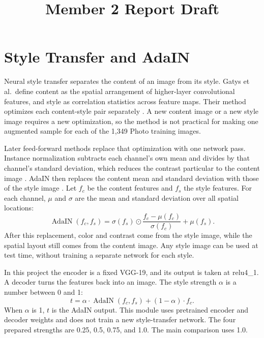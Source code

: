 \documentclass[a4paper]{article}
\title{Member 2 Report Draft}
\author{}
\date{}
\begin{document}
\maketitle

\section{Style Transfer and AdaIN}

Neural style transfer separates the content of an image from its style. Gatys et al.\ define content as the spatial arrangement of higher-layer convolutional features, and style as correlation statistics across feature maps. Their method optimizes each content-style pair separately \cite{gatys2016image}. A new content image or a new style image requires a new optimization, so the method is not practical for making one augmented sample for each of the 1,349 Photo training images.

Later feed-forward methods replace that optimization with one network pass. Instance normalization subtracts each channel's own mean and divides by that channel's standard deviation, which reduces the contrast particular to the content image \cite{ulyanov2016instance,ulyanov2017improved}. AdaIN then replaces the content mean and standard deviation with those of the style image \cite{huang2017adain}. Let $f_c$ be the content features and $f_s$ the style features. For each channel, $\mu$ and $\sigma$ are the mean and standard deviation over all spatial locations:
\begin{equation}
\operatorname{AdaIN}(f_c,f_s)
=
\sigma(f_s)\odot\frac{f_c-\mu(f_c)}{\sigma(f_c)}+\mu(f_s).
\end{equation}
After this replacement, color and contrast come from the style image, while the spatial layout still comes from the content image. Any style image can be used at test time, without training a separate network for each style.

In this project the encoder is a fixed VGG-19, and its output is taken at relu4\_1. A decoder turns the features back into an image. The style strength $\alpha$ is a number between 0 and 1:
\begin{equation}
t=\alpha\cdot\operatorname{AdaIN}(f_c,f_s)+(1-\alpha)\cdot f_c.
\end{equation}
When $\alpha$ is 1, $t$ is the AdaIN output. This module uses pretrained encoder and decoder weights and does not train a new style-transfer network. The four prepared strengths are 0.25, 0.5, 0.75, and 1.0. The main comparison uses 1.0.
\end{document}
